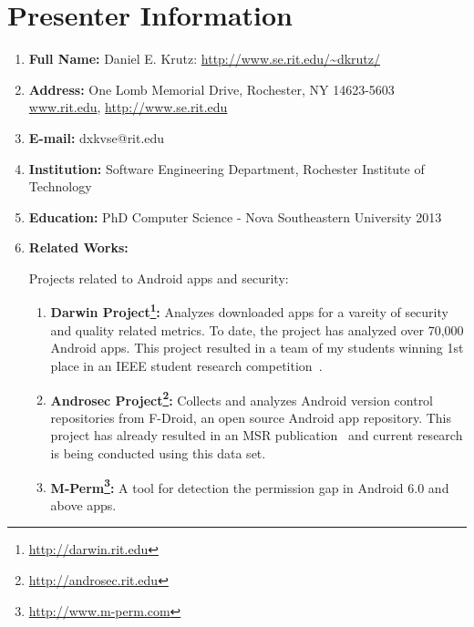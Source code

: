 \documentclass[titlepage]{article}
\begin{document}



\section{Presenter Information}




\begin{enumerate}
	\item \textbf{Full Name:} Daniel E. Krutz: \url{http://www.se.rit.edu/~dkrutz/}
	\item \textbf{Address:} One Lomb Memorial Drive, Rochester, NY 14623-5603 \url{www.rit.edu}, \url{http://www.se.rit.edu}
	\item \textbf{E-mail:} dxkvse@rit.edu
	\item \textbf{Institution:} Software Engineering Department, Rochester Institute of Technology
	\item \textbf{Education:} PhD Computer Science - Nova Southeastern University 2013
	\item \textbf{Related Works:}
	
	Projects related to Android apps and security:
	\begin{enumerate}
	
	\item \textbf{Darwin Project\footnote{\url{http://darwin.rit.edu}}:} Analyzes downloaded apps for a vareity of security and quality related metrics. To date, the project has analyzed over 70,000 Android apps. This project resulted in a team of my students winning 1st place in an IEEE student research competition~\cite{IEEE1stPlace_url}.
	
	\item \textbf{Androsec Project\footnote{\url{http://androsec.rit.edu}}:} Collects and analyzes Android version control repositories from F-Droid, an open source Android app repository. This project has already resulted in an MSR publication~\cite{krutz2015MSR} and current research is being conducted using this data set.
	
	
	\item \textbf{M-Perm\footnote{\url{http://www.m-perm.com}}:} A tool for detection the permission gap in Android 6.0 and above apps.
	

\end{enumerate}
\end{enumerate}
\end{document}
